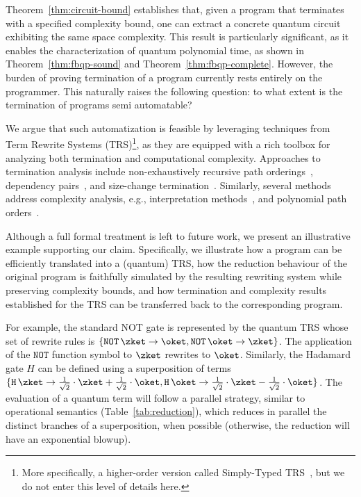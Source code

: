 Theorem~\ref{thm:circuit-bound} establishes that, given a program
that terminates with a specified complexity bound, one can extract a
concrete quantum circuit exhibiting the same space complexity. This result
is particularly significant, as it enables the characterization of
 quantum polynomial time, as shown in Theorem~\ref{thm:fbqp-sound} and
 Theorem~\ref{thm:fbqp-complete}. However, the burden of proving termination of
 a \hyrql{} program currently rests entirely on the programmer.
This naturally raises the following question: to what
extent is the termination of \hyrql{} programs semi automatable?

We argue that such automatization is feasible by leveraging techniques
from Term Rewrite Systems (TRS)\footnote{More specifically, a higher-order version
called Simply-Typed TRS~\cite{Yam01}, but we do not enter this level of details
here.}, as they
are equipped with a rich toolbox for analyzing both termination and
computational complexity. Approaches to termination analysis include
non-exhaustively recursive path
orderings~\cite{Der82,Der87}, dependency pairs~\cite{AG00}, and
size-change termination~\cite{LJBA01}. Similarly, several methods
address complexity analysis, e.g.,
interpretation methods~\cite{BMM11,MP09,BDL16}, and polynomial path
orders~\cite{Moser09,AM09}.

Although a full formal treatment is left to future work, we
present an illustrative example supporting our claim. Specifically, we
illustrate how a \hyrql{} program can be efficiently translated into a (quantum) TRS,
how the reduction behaviour of the original program is faithfully
simulated by the resulting rewriting system while preserving
complexity bounds, and how termination and complexity results
established for the TRS can be transferred back to the corresponding
\hyrql{} program.


For example, the standard NOT gate is represented by the quantum TRS whose set
of rewrite rules is $ \{\mathtt{NOT}\,\zket \to \oket, \mathtt{NOT}\,\oket \to
\zket\}$. The application of the $\mathtt{NOT}$ function symbol to $\zket$
rewrites to $\oket$. Similarly, the Hadamard gate $H$ can be defined using a
superposition of terms $ \{\mathtt{H}\,\zket \to \frac{1}{\sqrt 2} \cdot \zket
+ \frac{1}{\sqrt 2} \cdot \oket, \mathtt{H}\,\oket \to  \frac{1}{\sqrt 2} \cdot
\zket - \frac{1}{\sqrt 2} \cdot \oket\}$. The evaluation of a quantum term will
follow a parallel strategy, similar to \hyrql{} operational semantics
(Table~\ref{tab:reduction}), which reduces in parallel the distinct branches of
a superposition, when possible (otherwise, the reduction will have an
exponential blowup).

